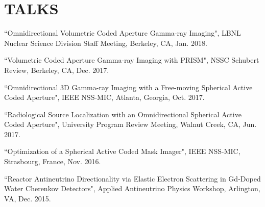 \section{\small{TALKS}}

 \begin{thebibliography}{3}
 \raggedright
 \vspace{10pt}

 ``Omnidirectional Volumetric Coded Aperture Gamma-ray Imaging", LBNL Nuclear Science Division Staff Meeting, Berkeley, CA, Jan. 2018.

 ``Volumetric Coded Aperture Gamma-ray Imaging with PRISM", NSSC Schubert Review, Berkeley, CA, Dec. 2017.

 ``Omnidirectional 3D Gamma-ray Imaging with a Free-moving Spherical Active Coded Aperture", IEEE NSS-MIC, Atlanta, Georgia, Oct. 2017.
 
  ``Radiological Source Localization with an Omnidirectional Spherical Active Coded Aperture", University Program Review Meeting, Walnut Creek, CA, Jun. 2017.
 
  ``Optimization of a Spherical Active Coded Mask Imager", IEEE NSS-MIC, Strasbourg, France, Nov. 2016.

 ``Reactor Antineutrino Directionality via Elastic Electron Scattering in Gd-Doped Water Cherenkov Detectors", Applied Antineutrino Physics Workshop, Arlington, VA, Dec. 2015.

 \end{thebibliography}
